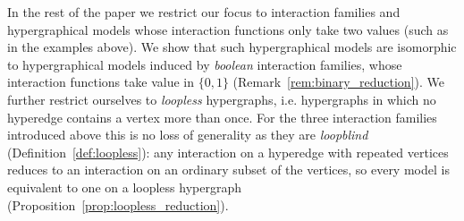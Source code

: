 \documentclass[11pt,reqno]{amsart}
\theoremstyle{plain}
\theoremstyle{definition}
\numberwithin{equation}{section}
\begin{document}
In the rest of the paper we restrict our focus to interaction families and hypergraphical models whose interaction functions only take two values (such as in the examples above). 
We show that such hypergraphical models are isomorphic to  hypergraphical models induced by \emph{boolean} interaction families, whose interaction functions take value in $\{0, 1\}$ (Remark~\ref{rem:binary_reduction}). We
further restrict ourselves to \emph{loopless} hypergraphs, i.e. hypergraphs in which no hyperedge contains a vertex more than once. For the three interaction families introduced above this is no loss of generality as they are \emph{loopblind} (Definition~\ref{def:loopless}): any interaction on a hyperedge with repeated vertices reduces to an interaction on an ordinary subset of the vertices, so every model is equivalent to one on a loopless hypergraph (Proposition~\ref{prop:loopless_reduction}).
\end{document}
